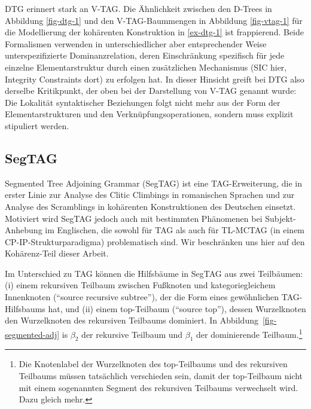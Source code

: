 DTG erinnert stark an V-TAG. Die Ähnlichkeit zwischen den D-Trees in Abbildung \ref{fig-dtg-1} und den V-TAG-Baummengen in Abbildung \ref{fig-vtag-1} für die Modellierung der kohärenten Konstruktion in \ref{ex-dtg-1} ist frappierend. Beide Formalismen verwenden in unterschiedlicher aber entsprechender Weise unterspezifizierte Dominanzrelation, deren Einschränkung spezifisch für jede einzelne Elementarstruktur durch einen zusätzlichen Mechanismus (SIC hier, Integrity Constraints dort) zu erfolgen hat. In dieser Hinsicht greift bei DTG also derselbe Kritikpunkt, der oben bei der Darstellung von V-TAG genannt wurde: Die Lokalität syntaktischer Beziehungen folgt nicht mehr aus der Form der Elementarstrukturen und den Verknüpfungsoperationen, sondern muss explizit stipuliert werden.  


\subsection{SegTAG}

\largerpage%
Segmented Tree Adjoining Grammar (SegTAG) ist eine TAG-Erweiterung, die \cite{Kulick:00} in erster Linie zur Analyse des Clitic Climbings in romanischen Sprachen und zur Analyse des Scramblings in kohärenten Konstruktionen des Deutschen einsetzt. Motiviert wird SegTAG jedoch auch mit bestimmten Phänomenen bei Subjekt-Anhebung im Englischen, die sowohl für TAG als auch für TL-MCTAG (in einem CP-IP-Strukturparadigma) problematisch sind. Wir beschränken uns hier auf den Kohärenz-Teil dieser Arbeit.

Im Unterschied zu TAG können die Hilfsbäume in SegTAG aus zwei Teilbäumen: (i) einem rekursiven Teilbaum zwischen Fuß\-knoten und kategoriegleichem Innenknoten ("`source recursive subtree"'), der die Form eines gewöhnlichen TAG-Hilfs\-baums hat, und (ii) einem top-Teilbaum ("`source top"'), dessen Wurzelknoten den Wurzelknoten des rekursiven Teilbaums dominiert. In Abbildung~\ref{fig-segmented-adj} is $\beta_2$ der rekursive Teilbaum und $\beta_1$ der dominierende Teilbaum.\footnote{Die Knotenlabel der Wurzelknoten des top-Teilbaums und des rekursiven Teilbaums müssen tatsächlich verschieden sein, damit der top-Teilbaum nicht mit einem sogenannten Segment des rekursiven Teilbaums verwechselt wird. Dazu gleich mehr.}\largerpage%

